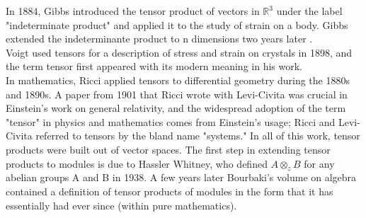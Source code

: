 \documentclass[12pt,a4paper]{article}
\begin{document}
 In 1884, Gibbs introduced the tensor product of vectors in $\mathbb{R}^3$ under the label "indeterminate product" and applied it to the study of strain on a body. Gibbs extended the indeterminante product to n dimensions two years later . \\Voigt used tensors for a description of stress and strain on crystals in 1898, and the term tensor first appeared with its modern meaning in his work.\\ In mathematics, Ricci applied tensors to differential geometry during the 1880s and 1890s. A paper from 1901 that Ricci wrote with Levi-Civita  was crucial in Einstein's work on general relativity, and the widespread adoption of the term "tensor" in physics and mathematics comes from Einstein's usage; Ricci and Levi-Civita referred to tensors by the bland name "systems." In all of this work, tensor products were built out of vector spaces. The first step in extending tensor products to modules is due to Hassler Whitney, who defined $A \otimes_z B$ for any abelian groups A and B in 1938. A few years later Bourbaki's volume on algebra contained a definition of tensor products of modules in the form that it has essentially had ever since (within pure mathematics).
\end{document}
